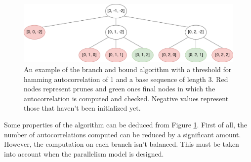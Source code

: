   \begin{figure}[ht!]
    \begin{center}
      \includegraphics[scale=0.4]{Chapters/Implementation/Example_branch_bound.png}
    \end{center}
    \caption{An example of the branch and bound algorithm with a threshold for
    hamming autocorrelation of 1 and a base sequence of length 3. Red nodes
    represent prunes and green ones final nodes in which the
    autocorrelation is computed and checked. Negative values represent those
    that haven't been initialized yet.}
    \label{bb:fig:1}
  \end{figure}

  Some properties of the algorithm can be deduced from Figure \ref{bb:fig:1}.
  First of all, the number of autocorrelations computed can be reduced by a
  significant amount. However, the computation on each branch isn't balanced. This
  must be taken into account when the parallelism model is designed.
